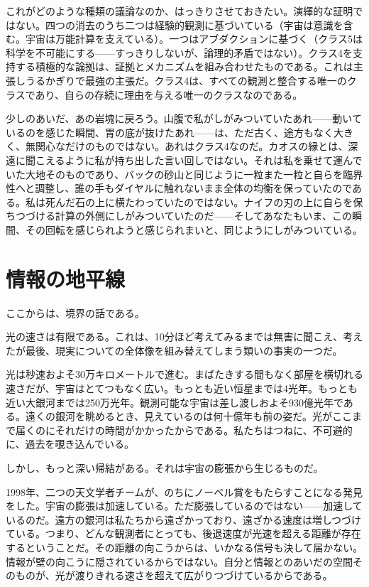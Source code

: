 \documentclass[11pt, twoside, openright]{book}
\begin{document}
これがどのような種類の議論なのか、はっきりさせておきたい。演繹的な証明ではない。四つの消去のうち二つは経験的観測に基づいている（宇宙は意識を含む。宇宙は万能計算を支えている）。一つはアブダクションに基づく（クラス5は科学を不可能にする------すっきりしないが、論理的矛盾ではない）。クラス4を支持する積極的な論拠は、証拠とメカニズムを組み合わせたものである。これは主張しうるかぎりで最強の主張だ。クラス4は、すべての観測と整合する唯一のクラスであり、自らの存続に理由を与える唯一のクラスなのである。

少しのあいだ、あの岩塊に戻ろう。山腹で私がしがみついていたあれ------動いているのを感じた瞬間、胃の底が抜けたあれ------は、ただ古く、途方もなく大きく、無関心なだけのものではない。あれはクラス4なのだ。カオスの縁とは、深遠に聞こえるように私が持ち出した言い回しではない。それは私を乗せて運んでいた大地そのものであり、バックの砂山と同じように一粒また一粒と自らを臨界性へと調整し、誰の手もダイヤルに触れないまま全体の均衡を保っていたのである。私は死んだ石の上に横たわっていたのではない。ナイフの刃の上に自らを保ちつづける計算の外側にしがみついていたのだ------そしてあなたもいま、この瞬間、その回転を感じられようと感じられまいと、同じようにしがみついている。


\section*{情報の地平線}

ここからは、境界の話である。

光の速さは有限である。これは、10分ほど考えてみるまでは無害に聞こえ、考えたが最後、現実についての全体像を組み替えてしまう類いの事実の一つだ。

光は秒速およそ30万キロメートルで進む。まばたきする間もなく部屋を横切れる速さだが、宇宙はとてつもなく広い。もっとも近い恒星までは4光年。もっとも近い大銀河までは250万光年。観測可能な宇宙は差し渡しおよそ930億光年である。遠くの銀河を眺めるとき、見えているのは何十億年も前の姿だ。光がここまで届くのにそれだけの時間がかかったからである。私たちはつねに、不可避的に、過去を覗き込んでいる。

しかし、もっと深い帰結がある。それは宇宙の膨張から生じるものだ。

1998年、二つの天文学者チームが、のちにノーベル賞をもたらすことになる発見をした。宇宙の膨張は加速している。ただ膨張しているのではない------加速しているのだ。遠方の銀河は私たちから遠ざかっており、遠ざかる速度は増しつづけている。つまり、どんな観測者にとっても、後退速度が光速を超える距離が存在するということだ。その距離の向こうからは、いかなる信号も決して届かない。情報が壁の向こうに隠されているからではない。自分と情報とのあいだの空間そのものが、光が渡りきれる速さを超えて広がりつづけているからである。
\end{document}
